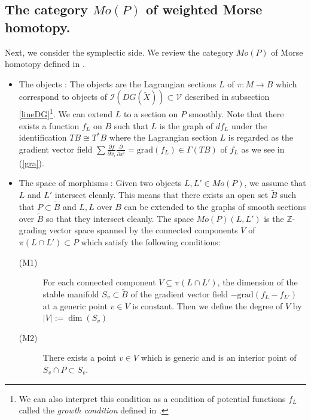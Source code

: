 \documentclass[12pt,reqno]{amsart}
\newcommand{\Z}{{\mathbb{Z}}}
\newcommand{\cI}{{\mathcal{I}}}
\newcommand{\cV}{{\mathcal{V}}}
\newcommand{\del}{{\partial}}
\newcommand{\grad}{{\mathrm{grad}}}
\theoremstyle{definition}
\begin{document}
\subsection{The category $Mo(P)$ of weighted Morse homotopy.}\label{Mo(P)}
Next, we consider the symplectic side.
We review the category $Mo(P)$ of Morse homotopy defined in \cite{fut-kaj1}.
\begin{itemize}
\item The objects : The objects are the Lagrangian sections $L$ of $\pi:M\to B$ which correspond to objects of $\cI(DG(\check{X}))\subset\cV$ described in subsection \ref{lineDG}\footnote{We can also interpret this condition as a condition of potential functions $f_L$ called the {\em growth condition} defined in \cite[Definition 3.1]{Chan}.}. We can extend $L$ to a section on $P$ smoothly. Note that there exists a function $f_L$ on $B$ such that $L$ is the graph of $df_L$ under the identification $TB\cong T^*B$ where the Lagrangian section $L$ is regarded as the gradient vector field $\sum\frac{\del f}{\del x_i}\frac{\del}{\del x^i}=\grad(f_L)\in\Gamma(TB)$ of $f_L$ as we see in (\ref{gra}).
\item The space of morphisms :  Given two objects $L,L'\in Mo(P)$, we assume that $L$ and $L'$ intersect cleanly. This means that there exists an open set $\tilde{B}$ such that $P\subset\tilde{B}$ and $L,L$ over $B$ can be extended to the graphs of smooth sections over $\tilde{B}$ so that they intersect cleanly.
 The space $Mo(P)(L,L')$ is the $\Z$-grading vector space spanned by the connected components $V$ of $\pi(L\cap L')\subset P$ which satisfy the following conditions:
\begin{description}
\item[(M1)] For each connected component $V\subseteq\pi(L\cap L')$, the dimension of the stable manifold $S_v\subset\tilde{B}$ of the gradient vector field $-\grad(f_L-f_{L'})$ at a generic point $v\in V$ is constant. Then we define the degree of $V$ by $|V|:=\dim(S_v)$
\item[(M2)] There exists a point $v\in V$ which is generic and is an interior point of $S_v\cap P\subset S_v$.
\end{description}


\end{itemize}
\end{document}

